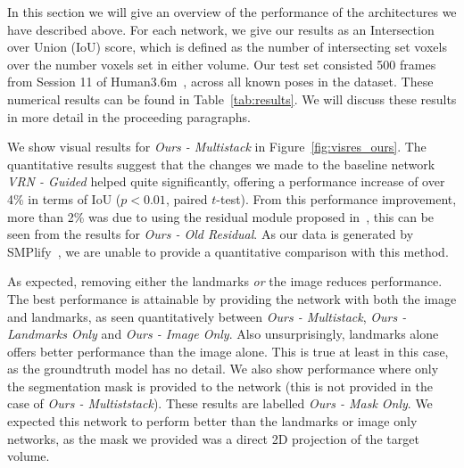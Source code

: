 In this section we will give an overview of the performance of the
architectures we have described above. For each network, we give our
results as an Intersection over Union (IoU) score, which is defined as
the number of intersecting set voxels over the number voxels set in
either volume. Our test set consisted 500 frames from Session 11 of
Human3.6m~\cite{h36m_pami}, across all known poses in the
dataset. These numerical results can be found in
Table~\ref{tab:results}. We will discuss these results in more detail
in the proceeding paragraphs.

We show visual results for \textit{Ours - Multistack} in
Figure~\ref{fig:visres_ours}. The quantitative results suggest that
the changes we made to the baseline network \textit{VRN - Guided}
helped quite significantly, offering a performance increase of over
4\% in terms of IoU ($p < 0.01$, paired $t$-test). From this
performance improvement, more than 2\% was due to using the residual
module proposed in~\cite{bulat2017binarized}, this can be seen from
the results for \textit{Ours - Old Residual}. As our data is generated
by SMPlify~\cite{bogo2016smplify}, we are unable to provide a
quantitative comparison with this method.

As expected, removing either the landmarks \textit{or} the image
reduces performance. The best performance is attainable by providing
the network with both the image and landmarks, as seen quantitatively
between \textit{Ours - Multistack}, \textit{Ours - Landmarks Only} and
\textit{Ours - Image Only}. Also unsurprisingly, landmarks alone
offers better performance than the image alone. This is true at least
in this case, as the groundtruth model has no detail. We also show
performance where only the segmentation mask is provided to the
network (this is not provided in the case of \textit{Ours -
  Multiststack}). These results are labelled \textit{Ours - Mask
  Only}. We expected this network to perform better than the landmarks
or image only networks, as the mask we provided was a direct 2D
projection of the target volume.


